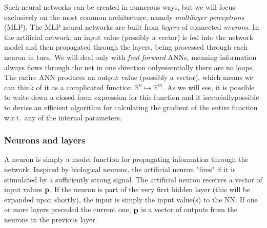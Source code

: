 \documentclass[a4paper, twocolumn]{article}
\begin{document}
Such neural networks can be created in numerous ways, but we will focus exclusively on the most common architecture, namely \emph{multilayer perceptrons} (MLP). The MLP neural networks are built from \emph{layers} of connected \emph{neurons}. In the artificial network, an input value (possibly a vector) is fed into the network model and then propagated through the layers, being processed through each neuron in turn. We will deal only with \emph{feed forward} ANNs, meaning information always flows through the net in one direction only\textemdash essentially there are no loops. The entire ANN produces an output value (possibly a vector), which means we can think of it as a complicated function $\mathbb{R}^n\mapsto \mathbb{R}^m$. As we will see, it is possible to write down a closed form expression for this function and it is\textemdash crucially\textemdash possible to devise an efficient algorithm for calculating the gradient of the entire function w.r.t.\ any of the internal parameters.

\subsubsection{Neurons and layers}
A neuron is simply a model function for propagating information through the network. Inspired by biological neurons, the artificial neuron "fires" if it is stimulated by a sufficiently strong signal. The artificial neuron receives a vector of input values ${\bf p}$. If the neuron is part of the very first hidden layer (this will be expanded upon shortly), the input is simply the input value(s) to the NN. If one or more layers preceded the current one, ${\bf p}$ is a vector of outputs from the neurons in the previous layer.
\end{document}
